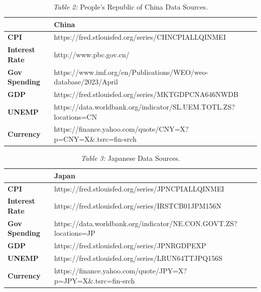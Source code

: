 \documentclass[11pt,regno]{amsart}
\theoremstyle{plain}
\numberwithin{equation}{section}
\begin{document}
\begin{table}[]
\caption*{\textit{Table 2:} People's Republic of China Data Sources.}
\begin{tabular}{|l|l|}
 \hline
                       & \textbf{China}                                                   \\ \hline
\textbf{CPI}           & https://fred.stlouisfed.org/series/CHNCPIALLQINMEI               \\ \hline
\textbf{Interest Rate} & http://www.pbc.gov.cn/                                           \\ \hline
\textbf{Gov Spending}  & https://www.imf.org/en/Publications/WEO/weo-database/2023/April  \\ \hline
\textbf{GDP}           & https://fred.stlouisfed.org/series/MKTGDPCNA646NWDB              \\ \hline
\textbf{UNEMP}         & https://data.worldbank.org/indicator/SL.UEM.TOTL.ZS?locations=CN \\ \hline
\textbf{Currency}      & https://finance.yahoo.com/quote/CNY=X?p=CNY=X\&.tsrc=fin-srch    \hline \\
\hline
\end{tabular}
\end{table}

\begin{table}[]
\caption*{\textit{Table 3:} Japanese Data Sources.}
\begin{tabular}{|l|l|}
\hline
                       & \textbf{Japan}                                                   \\ \hline
\textbf{CPI}           & https://fred.stlouisfed.org/series/JPNCPIALLQINMEI               \\ \hline
\textbf{Interest Rate} & https://fred.stlouisfed.org/series/IRSTCB01JPM156N               \\ \hline
\textbf{Gov Spending}  & https://data.worldbank.org/indicator/NE.CON.GOVT.ZS?locations=JP \\ \hline
\textbf{GDP}           & https://fred.stlouisfed.org/series/JPNRGDPEXP                    \\ \hline
\textbf{UNEMP}         & https://fred.stlouisfed.org/series/LRUN64TTJPQ156S               \\ \hline
\textbf{Currency}      & https://finance.yahoo.com/quote/JPY=X?p=JPY=X\&.tsrc=fin-srch    \\ \hline
\end{tabular}
\end{table}
\end{document}
